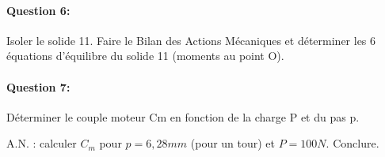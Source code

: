 \reponse[10]

\paragraph{Question 6:} Isoler le solide 11. Faire le Bilan des Actions Mécaniques et déterminer les 6 équations d'équilibre du solide 11 (moments au point O).

\reponse[10]

\paragraph{Question 7:} Déterminer le couple moteur Cm en fonction de la charge P et du pas p.

\reponse[6]

A.N. : calculer $C_m$ pour $p = 6,28 mm$ (pour un tour) et $P = 100 N$. Conclure.



